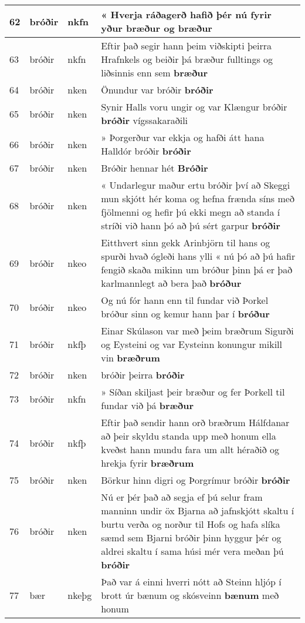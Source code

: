 \documentclass{article}
\begin{document}
\begin{longtable}{p{1cm}|p{1cm}|p{1cm}|p{13cm}}
\hline
62&bróðir&nkfn&« Hverja ráðagerð hafið þér nú fyrir yður bræður og \textbf{bræður} \\
\hline
63&bróðir&nkfn&Eftir það segir hann þeim viðskipti þeirra Hrafnkels og beiðir þá bræður fulltings og liðsinnis enn sem \textbf{bræður} \\
\hline
64&bróðir&nken&Önundur var bróðir \textbf{bróðir} \\
\hline
65&bróðir&nken&Synir Halls voru ungir og var Klængur bróðir \textbf{bróðir} vígssakaraðili\\
\hline
66&bróðir&nken&» Þorgerður var ekkja og hafði átt hana Halldór bróðir \textbf{bróðir} \\
\hline
67&bróðir&nken&Bróðir hennar hét \textbf{Bróðir} \\
\hline
68&bróðir&nken&« Undarlegur maður ertu bróðir því að Skeggi mun skjótt hér koma og hefna frænda síns með fjölmenni og hefir þú ekki megn að standa í stríði við hann þó að þú sért garpur \textbf{bróðir} \\
\hline
69&bróðir&nkeo&Eitthvert sinn gekk Arinbjörn til hans og spurði hvað ógleði hans ylli « nú þó að þú hafir fengið skaða mikinn um bróður þinn þá er það karlmannlegt að bera það \textbf{bróður} \\
\hline
70&bróðir&nkeo&Og nú fór hann enn til fundar við Þorkel bróður sinn og kemur hann þar í \textbf{bróður} \\
\hline
71&bróðir&nkfþ&Einar Skúlason var með þeim bræðrum Sigurði og Eysteini og var Eysteinn konungur mikill vin \textbf{bræðrum} \\
\hline
72&bróðir&nken&bróðir þeirra \textbf{bróðir} \\
\hline
73&bróðir&nkfn&» Síðan skiljast þeir bræður og fer Þorkell til fundar við þá \textbf{bræður} \\
\hline
74&bróðir&nkfþ&Eftir það sendir hann orð bræðrum Hálfdanar að þeir skyldu standa upp með honum ella kveðst hann mundu fara um allt héraðið og hrekja fyrir \textbf{bræðrum} \\
\hline
75&bróðir&nken&Börkur hinn digri og Þorgrímur bróðir \textbf{bróðir} \\
\hline
76&bróðir&nken&Nú er þér það að segja ef þú selur fram manninn undir öx Bjarna að jafnskjótt skaltu í burtu verða og norður til Hofs og hafa slíka sæmd sem Bjarni bróðir þinn hyggur þér og aldrei skaltu í sama húsi mér vera meðan þú \textbf{bróðir} \\
\hline
77&bær&nkeþg&Það var á einni hverri nótt að Steinn hljóp í brott úr bænum og skósveinn \textbf{bænum} með honum\\

\end{longtable}
\end{document}
